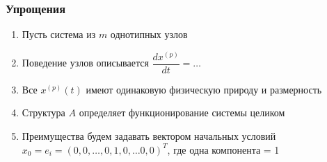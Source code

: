 	\subsubsection*{Упрощения}
	\begin{enumerate}
		\item Пусть система из \(m\) однотипных узлов
		\item Поведение узлов описывается $\dfrac{dx^{(p)}}{dt} = \dots$
		\item Все $x^{(p)}(t)$ имеют одинаковую физическую природу и размерность
		\item Структура $A$ определяет функционирование системы целиком
		\item Преимущества будем задавать вектором начальных условий $x_0 = e_i = (0, 0, \dots, 0, 1, 0, \dots 0, 0)^T$, где одна компонента = 1
	\end{enumerate}
	
	\newpage
	
